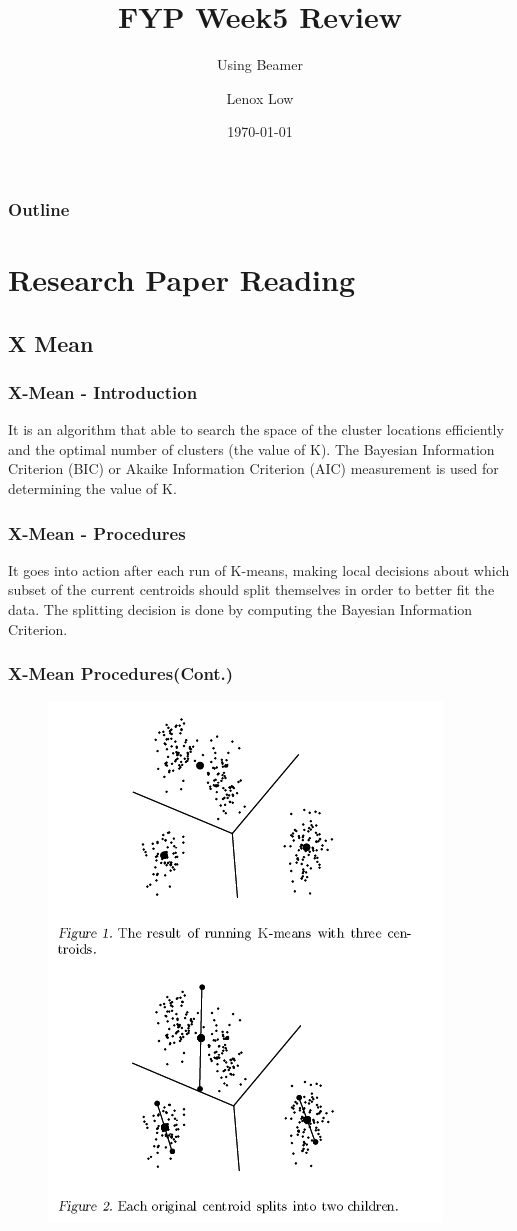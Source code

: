 \documentclass{beamer}
\title{FYP Week5 Review}
\subtitle{Using Beamer}
\author{Lenox Low}
\institute{Multimedia University Cyberjaya Campus}
\date{\today}
\begin{document}
\begin{frame}
\titlepage
\end{frame}

\begin{frame}
\frametitle{Outline}
\tableofcontents
\end{frame}

\section{Research Paper Reading}
\subsection{X Mean}

\begin{frame}
\frametitle{X-Mean - Introduction}
It is an algorithm that able to search the space of the cluster locations efficiently and the optimal number of clusters (the value of K). The Bayesian Information Criterion (BIC) or Akaike Information Criterion (AIC) measurement is used for determining the value of K. 

\end{frame}

\begin{frame}
\frametitle{X-Mean - Procedures}
It goes into action after each run of K-means, making local decisions about which subset of the current centroids should split themselves in order to better fit the data. The splitting decision is done by computing the Bayesian Information Criterion.
\end{frame}

\begin{frame}
\frametitle{X-Mean Procedures(Cont.)}
\begin{figure}[hbt!]\centering
\includegraphics[scale=0.3]{image/xmean1}
\end{figure}
\end{frame}
\end{document}

